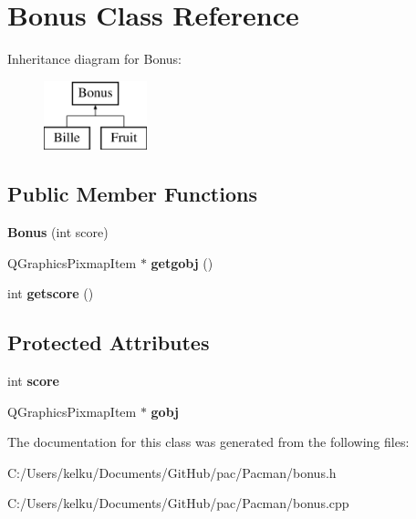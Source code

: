 \hypertarget{class_bonus}{}\section{Bonus Class Reference}
\label{class_bonus}
Inheritance diagram for Bonus\+:\begin{figure}[H]
\begin{center}
\leavevmode
\includegraphics[height=2.000000cm]{class_bonus}
\end{center}
\end{figure}
\subsection*{Public Member Functions}
\begin{DoxyCompactItemize}
\item 
\hypertarget{class_bonus_a5bbcd9d82df54d6a70602faa171a7164}{}{\bfseries Bonus} (int score)\label{class_bonus_a5bbcd9d82df54d6a70602faa171a7164}

\item 
\hypertarget{class_bonus_ae0c69d39bdfdc4428f469717c8a72624}{}Q\+Graphics\+Pixmap\+Item $\ast$ {\bfseries getgobj} ()\label{class_bonus_ae0c69d39bdfdc4428f469717c8a72624}

\item 
\hypertarget{class_bonus_a26a1d8ea0491aaedcf316a6b936c8bf4}{}int {\bfseries getscore} ()\label{class_bonus_a26a1d8ea0491aaedcf316a6b936c8bf4}

\end{DoxyCompactItemize}
\subsection*{Protected Attributes}
\begin{DoxyCompactItemize}
\item 
\hypertarget{class_bonus_a4a5dd0c3a6742fa6948a52340c362dc4}{}int {\bfseries score}\label{class_bonus_a4a5dd0c3a6742fa6948a52340c362dc4}

\item 
\hypertarget{class_bonus_aadaf83c0fd63bc3ebeb327f91cff2139}{}Q\+Graphics\+Pixmap\+Item $\ast$ {\bfseries gobj}\label{class_bonus_aadaf83c0fd63bc3ebeb327f91cff2139}

\end{DoxyCompactItemize}


The documentation for this class was generated from the following files\+:\begin{DoxyCompactItemize}
\item 
C\+:/\+Users/kelku/\+Documents/\+Git\+Hub/pac/\+Pacman/bonus.\+h\item 
C\+:/\+Users/kelku/\+Documents/\+Git\+Hub/pac/\+Pacman/bonus.\+cpp\end{DoxyCompactItemize}
